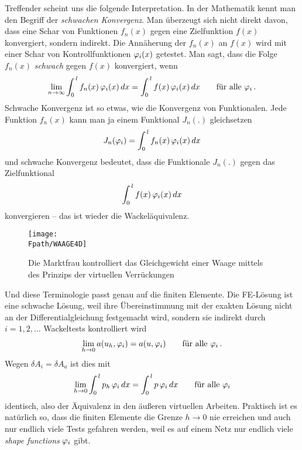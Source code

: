 Treffender scheint uns die folgende Interpretation. In der Mathematik kennt man den Begriff der {\em schwachen Konvergenz\/}. Man \"{u}berzeugt sich nicht direkt davon, dass eine Schar von Funktionen $f_n(x)$ gegen eine Zielfunktion $f(x)$ konvergiert, sondern indirekt. Die Ann\"{a}herung der $f_n(x)$ an $f(x)$ wird mit einer Schar von Kontrollfunktionen $\varphi_i(x)$ getestet. Man sagt, dass die Folge $f_n(x)$ {\em schwach\/} gegen $f(x)$ konvergiert, wenn
\begin{align}
\lim_{n \to \infty} \int_0^{\,l} f_n(x)\,\varphi_i(x)\,dx = \int_0^{\,l} f(x)\,\varphi_i(x)\,dx \qquad \text{f\"{u}r alle $\varphi_i$}\,.
\end{align}
Schwache Konvergenz ist so etwas, wie die Konvergenz von Funktionalen. Jede Funktion $f_n(x)$ kann man ja einem Funktional $J_n(.)$  gleichsetzen
\begin{align}
J_n(\varphi_i) = \int_0^{\,l} f_n(x)\,\varphi_i(x)\,dx
\end{align}
und schwache Konvergenz bedeutet, dass die Funktionale $J_n(.)$ gegen das Zielfunktional
\begin{align}
\int_0^{\,l} f(x)\,\varphi_i(x)\,dx
\end{align}
konvergieren -- das ist wieder die \glq Wackel\"{a}quivalenz\grq{}.
\begin{figure}[tbp]
\centering
\if {} \sidecaption \fi
\texttt{[image: \\Fpath/WAAGE4D]}
\caption{Die Marktfrau kontrolliert das Gleichgewicht einer Waage mittels des Prinzips
der virtuellen Verr\"{u}ckungen} \label{Waage}
\end{figure}%

Und diese Terminologie passt genau auf die finiten Elemente. Die FE-L\"{o}sung ist eine schwache L\"{o}sung, weil ihre \"{U}bereinstimmung mit der exakten L\"{o}sung nicht an der Differentialgleichung festgemacht wird, sondern sie indirekt durch $i = 1,2,\ldots$ \glq Wackeltests\grq{} kontrolliert wird
\begin{align}
\lim_{h \to 0} a(u_h,\varphi_i) = a(u, \varphi_i) \qquad \text{f\"{u}r alle $\varphi_i$}\,.
\end{align}
Wegen $\delta A_i = \delta A_a$ ist dies mit
\begin{align}
\lim_{h \to 0} \int_0^{\,l} p_h\,\varphi_i\,dx = \int_0^{\,l} p\,\varphi_i\,dx  \qquad \text{f\"{u}r alle $\varphi_i$}
\end{align}
identisch, also der \"{A}quivalenz in den \"{a}u{\ss}eren virtuellen Arbeiten. Praktisch ist es nat\"{u}rlich so, dass die finiten Elemente die Grenze $h \to 0$ nie erreichen und auch nur endlich viele Tests gefahren werden, weil es auf einem Netz nur endlich viele {\em shape functions\/} $\varphi_i$ gibt.\\

